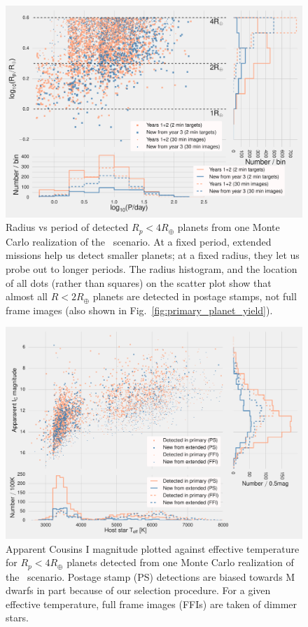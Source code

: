 \begin{figure}[t]
	\centering
	\includegraphics[]{figures/logR_vs_logP.pdf}
	\caption{Radius vs period of detected $R_p<4R_\oplus$ planets from one Monte Carlo realization of the \nhemi\ scenario.
	At a fixed period, extended missions help us detect smaller planets; at a fixed radius, they let us probe out to longer periods.
	The radius histogram, and the location of all dots (rather than squares) on the scatter plot show that almost all $R<2R_\oplus$ planets are detected in postage stamps, not full frame images (also shown in Fig.~\protect\ref{fig:primary_planet_yield}).}
	\label{fig:radius_vs_period_nhemi}
\end{figure}
\begin{figure}[t]
	\centering
	\includegraphics[]{figures/temp_imag_vs_teff_nhemi.pdf}
	\caption{Apparent Cousins I magnitude plotted against effective temperature for $R_p<4R_\oplus$ planets detected from one Monte Carlo realization of the \nhemi\ scenario. 
	Postage stamp (PS) detections are biased towards M dwarfs in part because of our selection procedure.
	For a given effective temperature, full frame images (FFIs) are taken of dimmer stars.}
	\label{fig:imag_vs_teff_nhemi}
\end{figure}

